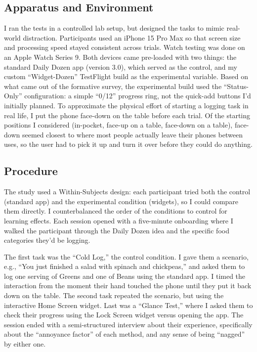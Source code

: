 \documentclass[10pt,twocolumn]{article}
\begin{document}
\subsection{Apparatus and Environment}

I ran the tests in a controlled lab setup, but designed the tasks to mimic real-world distraction. Participants used an iPhone 15 Pro Max so that screen size and processing speed stayed consistent across trials. Watch testing was done on an Apple Watch Series 9. Both devices came pre-loaded with two things: the standard Daily Dozen app (version 3.0), which served as the control, and my custom ``Widget-Dozen'' TestFlight build as the experimental variable. Based on what came out of the formative survey, the experimental build used the ``Status-Only'' configuration: a simple ``0/12'' progress ring, not the quick-add buttons I'd initially planned. To approximate the physical effort of starting a logging task in real life, I put the phone face-down on the table before each trial. Of the starting positions I considered (in-pocket, face-up on a table, face-down on a table), face-down seemed closest to where most people actually leave their phones between uses, so the user had to pick it up and turn it over before they could do anything.

\subsection{Procedure}

The study used a Within-Subjects design: each participant tried both the control (standard app) and the experimental condition (widgets), so I could compare them directly. I counterbalanced the order of the conditions to control for learning effects. Each session opened with a five-minute onboarding where I walked the participant through the Daily Dozen idea and the specific food categories they'd be logging.

The first task was the ``Cold Log,'' the control condition. I gave them a scenario, e.g., ``You just finished a salad with spinach and chickpeas,'' and asked them to log one serving of Greens and one of Beans using the standard app. I timed the interaction from the moment their hand touched the phone until they put it back down on the table. The second task repeated the scenario, but using the interactive Home Screen widget. Last was a ``Glance Test,'' where I asked them to check their progress using the Lock Screen widget versus opening the app. The session ended with a semi-structured interview about their experience, specifically about the ``annoyance factor'' of each method, and any sense of being ``nagged'' by either one.
\end{document}
